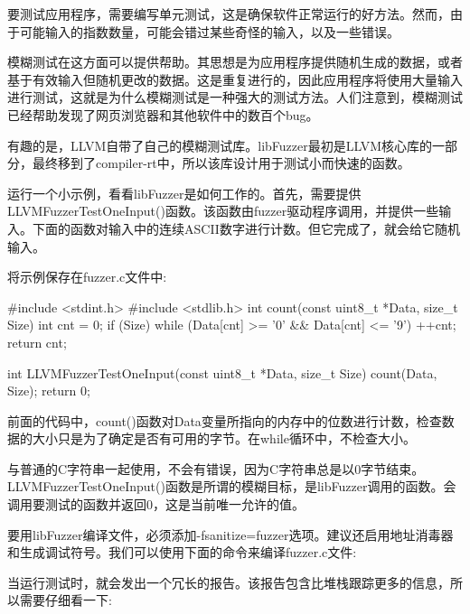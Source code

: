
要测试应用程序，需要编写单元测试，这是确保软件正常运行的好方法。然而，由于可能输入的指数数量，可能会错过某些奇怪的输入，以及一些错误。

模糊测试在这方面可以提供帮助。其思想是为应用程序提供随机生成的数据，或者基于有效输入但随机更改的数据。这是重复进行的，因此应用程序将使用大量输入进行测试，这就是为什么模糊测试是一种强大的测试方法。人们注意到，模糊测试已经帮助发现了网页浏览器和其他软件中的数百个bug。

有趣的是，LLVM自带了自己的模糊测试库。libFuzzer最初是LLVM核心库的一部分，最终移到了compiler-rt中，所以该库设计用于测试小而快速的函数。

运行一个小示例，看看libFuzzer是如何工作的。首先，需要提供LLVMFuzzerTestOneInput()函数。该函数由fuzzer驱动程序调用，并提供一些输入。下面的函数对输入中的连续ASCII数字进行计数。但它完成了，就会给它随机输入。

将示例保存在fuzzer.c文件中:

\begin{cpp}
#include <stdint.h>
#include <stdlib.h>
int count(const uint8_t *Data, size_t Size) {
    int cnt = 0;
    if (Size)
        while (Data[cnt] >= '0' && Data[cnt] <= '9') ++cnt;
    return cnt;
}

int LLVMFuzzerTestOneInput(const uint8_t *Data, size_t Size) {
    count(Data, Size);
    return 0;
}
\end{cpp}

前面的代码中，count()函数对Data变量所指向的内存中的位数进行计数，检查数据的大小只是为了确定是否有可用的字节。在while循环中，不检查大小。

与普通的C字符串一起使用，不会有错误，因为C字符串总是以0字节结束。LLVMFuzzerTestOneInput()函数是所谓的模糊目标，是libFuzzer调用的函数。会调用要测试的函数并返回0，这是当前唯一允许的值。

要用libFuzzer编译文件，必须添加-fsanitize=fuzzer选项。建议还启用地址消毒器和生成调试符号。我们可以使用下面的命令来编译fuzzer.c文件:


当运行测试时，就会发出一个冗长的报告。该报告包含比堆栈跟踪更多的信息，所以需要仔细看一下:

